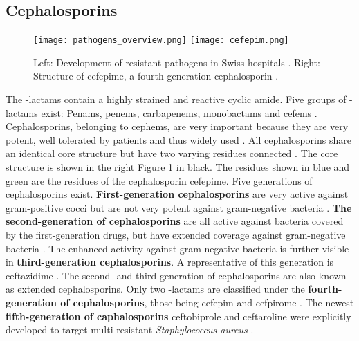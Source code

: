 \subsection{Cephalosporins}
\begin{figure}
	\texttt{[image: pathogens\_overview.png]}
	\texttt{[image: cefepim.png]}
	\caption{Left: Development of resistant pathogens in Swiss hospitals \cite{swiss_hospitals_pathogens}. Right: Structure of cefepime, a fourth-generation cephalosporin \cite{noauthor_datei:cefepim_nodate}.}
	\label{figure:pathogen_dvelopment}
	\label{figure:cefepim}
\end{figure}
The \textbeta-lactams contain a highly strained and reactive cyclic amide. Five groups of \textbeta-lactams exist: Penams, penems, carbapenems, monobactams and cefems \cite{beta-lactam_nodate}. 
Cephalosporins, belonging to cephems, are very important because they are very potent, well tolerated by patients and thus widely used \cite{dancer_problem_2001}. 
All cephalosporins share an identical core structure but have two varying residues connected \cite{noauthor_cephalosporine_2019}. The core structure is shown in the right Figure \ref{figure:cefepim} in black. The residues shown in blue and green are the residues of the cephalosporin cefepime. Five generations of cephalosporins exist.
\textbf{First-generation cephalosporins} are very active against gram-positive cocci but are not very potent against gram-negative bacteria \cite{fernandes_-lactams:_2013}. \textbf{The second-generation of cephalosporins} are all active against bacteria covered by the first-generation drugs, but have extended coverage against gram-negative bacteria \cite{fernandes_-lactams:_2013}. The enhanced activity against gram-negative bacteria is further visible in \textbf{third-generation cephalosporins}. A representative of this generation is ceftazidime \cite{klein_third-generation_1995}. The second- and third-generation of cephalosporins are also known as extended cephalosporins. Only two \textbeta-lactams are classified under the \textbf{fourth-generation of cephalosporins}, those being cefepim and cefpirome \cite{fernandes_-lactams:_2013}. The newest \textbf{fifth-generation of caphalosporins} ceftobiprole and ceftaroline  were explicitly developed to target multi resistant \textit{Staphylococcus aureus} \cite{fernandes_-lactams:_2013}.

